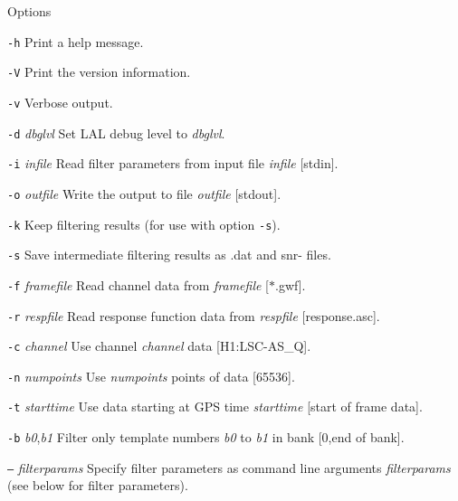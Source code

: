 \begin{entry}
\item[Options]\leavevmode
\begin{entry}
\item[\texttt{-h}]
Print a help message.
\item[\texttt{-V}]
Print the version information.
\item[\texttt{-v}]
Verbose output.
\item[\texttt{-d} \textit{dbglvl}]
Set LAL debug level to \textit{dbglvl}.
\item[\texttt{-i} \textit{infile}]
Read  filter  parameters  from  input  file \textit{infile} [stdin].
\item[\texttt{-o} \textit{outfile}]
Write the output to file \textit{outfile} [stdout].
\item[\texttt{-k}]
Keep filtering results (for use with option \texttt{-s}).
\item[\texttt{-s}]
Save  intermediate  filtering  results  as .dat and snr- files.
\item[\texttt{-f} \textit{framefile}]
Read channel data from \textit{framefile} [$\ast$.gwf].
\item[\texttt{-r} \textit{respfile}]
Read   response   function   data   from  \textit{respfile} [response.asc].
\item[\texttt{-c} \textit{channel}]
Use channel \textit{channel} data [H1:LSC-AS\_Q].
\item[\texttt{-n} \textit{numpoints}]
Use \textit{numpoints} points of data [65536].
\item[\texttt{-t} \textit{starttime}]
Use  data  starting at GPS time \textit{starttime} [start of frame data].
\item[\texttt{-b} \textit{b0},\textit{b1}]
Filter only template numbers \textit{b0} to \textit{b1} in bank [0,end of bank].
\item[\texttt{--} \textit{filterparams}]
Specify filter parameters as command line arguments \textit{filterparams}
(see below for filter parameters).
\end{entry}


\end{entry}
